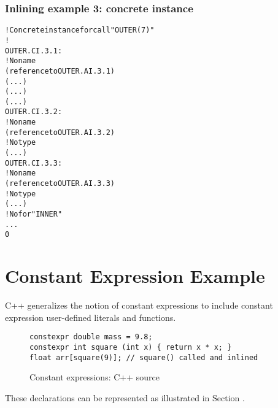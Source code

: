 \subsubsection{Inlining example 3: concrete instance}
\label{app:inliningexample3concreteinstance}
\begin{alltt}
    ! Concrete instance for call "OUTER(7)"
    !
OUTER.CI.3.1:
        ! No name
        (reference to OUTER.AI.3.1)
        (...)
        (...)
        (...)
OUTER.CI.3.2:
            ! No name
            (reference to OUTER.AI.3.2)
            ! No type
            (...)
OUTER.CI.3.3:
            ! No name
            (reference to OUTER.AI.3.3)
            ! No type
            (...)
        ! No  for "INNER"
        ...
        0
\end{alltt}

\section{Constant Expression Example}
\label{app:constantexpressionexample}
C++ generalizes the notion of constant expressions to include
constant expression user-defined literals and functions.

\begin{figure}[here]
\begin{lstlisting}
constexpr double mass = 9.8;
constexpr int square (int x) { return x * x; }
float arr[square(9)]; // square() called and inlined
\end{lstlisting}
\caption{Constant expressions: C++ source} \label{fig:constantexpressionscsource}
\end{figure}

These declarations can be represented as illustrated in 
Section .

